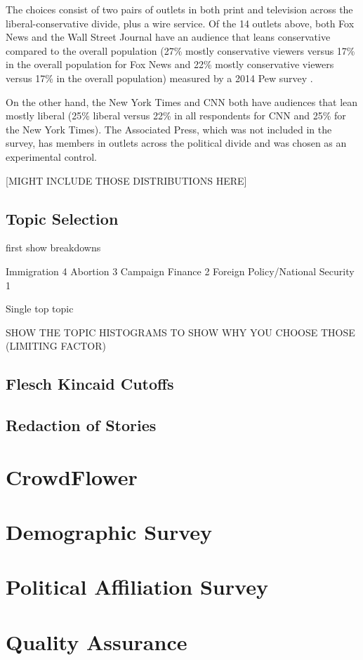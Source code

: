 The choices consist of two pairs of outlets in both print and television across the liberal-conservative divide, plus a wire service. Of the 14 outlets above, both Fox News and the Wall Street Journal have an audience that leans conservative compared to the overall population (27\% mostly conservative viewers versus 17\% in the overall population for Fox News and 22\% mostly conservative viewers versus 17\% in the overall population) measured by a 2014 Pew survey \cite{PoliticalPolarization}.

On the other hand, the New York Times and CNN both have audiences that lean mostly liberal (25\% liberal versus 22\% in all respondents for CNN and 25\% for the New York Times). The Associated Press, which was not included in the survey, has members in outlets across the political divide and was chosen as an experimental control. 

[MIGHT INCLUDE THOSE DISTRIBUTIONS HERE]

\subsection {Topic Selection}


first show breakdowns

Immigration                         4
Abortion                            3
Campaign Finance                    2
Foreign Policy/National Security    1




Single top topic

SHOW THE TOPIC HISTOGRAMS
TO SHOW WHY YOU CHOOSE THOSE (LIMITING FACTOR)


\subsection {Flesch Kincaid Cutoffs}
\subsection {Redaction of Stories}

 

\section{CrowdFlower}
\section{Demographic Survey}
\section{Political Affiliation Survey}
\section{Quality Assurance}
